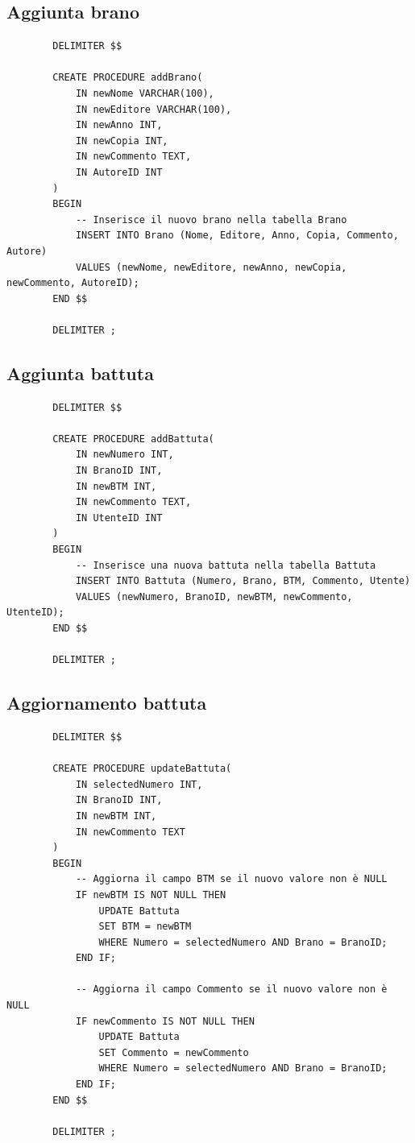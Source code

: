 \documentclass{article}
\begin{document}
    \subsection{Aggiunta brano}
    
    \begin{verbatim}
        DELIMITER $$

        CREATE PROCEDURE addBrano(
            IN newNome VARCHAR(100),
            IN newEditore VARCHAR(100),
            IN newAnno INT,
            IN newCopia INT,
            IN newCommento TEXT,
            IN AutoreID INT
        )
        BEGIN
            -- Inserisce il nuovo brano nella tabella Brano
            INSERT INTO Brano (Nome, Editore, Anno, Copia, Commento, Autore)
            VALUES (newNome, newEditore, newAnno, newCopia, newCommento, AutoreID);
        END $$

        DELIMITER ;
    \end{verbatim}

    \subsection{Aggiunta battuta}

    \begin{verbatim}
        DELIMITER $$

        CREATE PROCEDURE addBattuta(
            IN newNumero INT,
            IN BranoID INT,
            IN newBTM INT,
            IN newCommento TEXT,
            IN UtenteID INT
        )
        BEGIN
            -- Inserisce una nuova battuta nella tabella Battuta
            INSERT INTO Battuta (Numero, Brano, BTM, Commento, Utente)
            VALUES (newNumero, BranoID, newBTM, newCommento, UtenteID);
        END $$

        DELIMITER ;
    \end{verbatim}
    
    \subsection{Aggiornamento battuta}
    
    \begin{verbatim}
        DELIMITER $$

        CREATE PROCEDURE updateBattuta(
            IN selectedNumero INT,
            IN BranoID INT,
            IN newBTM INT,
            IN newCommento TEXT
        )
        BEGIN
            -- Aggiorna il campo BTM se il nuovo valore non è NULL
            IF newBTM IS NOT NULL THEN
                UPDATE Battuta
                SET BTM = newBTM
                WHERE Numero = selectedNumero AND Brano = BranoID;
            END IF;

            -- Aggiorna il campo Commento se il nuovo valore non è NULL
            IF newCommento IS NOT NULL THEN
                UPDATE Battuta
                SET Commento = newCommento
                WHERE Numero = selectedNumero AND Brano = BranoID;
            END IF;
        END $$

        DELIMITER ;
    \end{verbatim}
    
\end{document}
